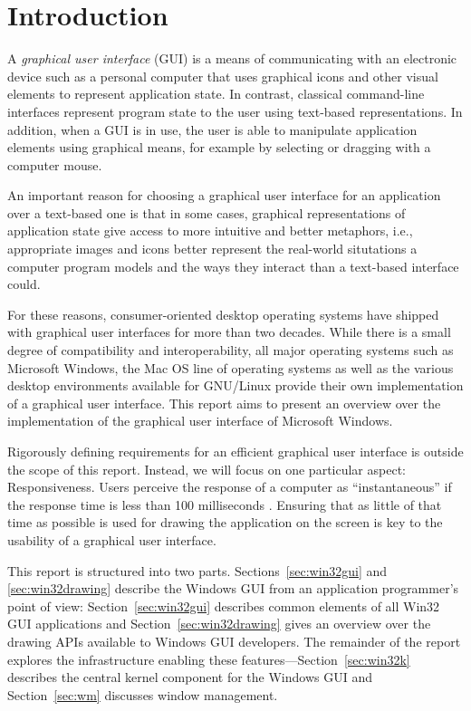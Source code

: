 	\section{Introduction}
		A \textit{graphical user interface} (GUI) is a means of communicating
		with an electronic device such as a personal computer that uses graphical
		icons and other visual elements to represent application state. In
		contrast, classical command-line interfaces represent program state to
		the user using text-based representations. In addition, when a GUI is
		in use, the user is able to manipulate application elements using graphical
		means, for example by selecting or dragging with a computer mouse.

		An important reason for choosing a graphical user interface for an
		application over a text-based one is that in some cases, graphical
		representations of application state give access to more intuitive and
		better metaphors, i.e., appropriate images and icons better represent
		the real-world situtations a computer program models and the ways they
		interact than a text-based interface could.

		For these reasons, consumer-oriented desktop operating systems have
		shipped with graphical user interfaces for more than two decades. While
		there is a small degree of
		compatibility and interoperability, all major operating systems such
		as Microsoft Windows, the Mac OS line of operating systems as well
		as the various desktop environments available for GNU/Linux
		provide their own implementation of a graphical user interface. This
		report aims to present an overview over the implementation of the
		graphical user interface of Microsoft Windows.

		Rigorously defining requirements for an efficient graphical user
		interface is outside the scope of this report. Instead, we will focus
		on one particular aspect: Responsiveness. Users perceive the response
		of a computer as \enquote{instantaneous} if the response time is less
		than 100 milliseconds \cite{miller1968response}. Ensuring that as
		little of that time as possible is used for drawing the application on
		the screen is key to the usability of a graphical user interface.

		This report is structured into two parts. Sections~\ref{sec:win32gui} and
		\ref{sec:win32drawing} describe the Windows GUI from an application
		programmer's point of view: Section~\ref{sec:win32gui} describes common
		elements of all Win32 GUI applications and Section~\ref{sec:win32drawing}
		gives an overview over the drawing APIs available to Windows GUI developers.
		The remainder of the report explores the infrastructure enabling
		these features---Section~\ref{sec:win32k} describes the central kernel component
		for the Windows GUI and Section~\ref{sec:wm} discusses window management.

